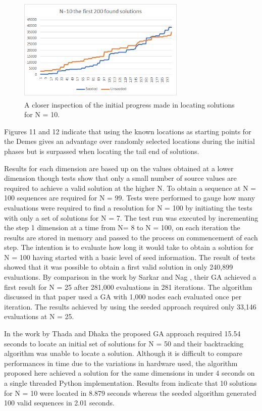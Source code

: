 \documentclass[conference]{IEEEtran}
\begin{document}
\begin{figure}[!htbp]
	\centering	
	\includegraphics[width=8cm, height=5cm]{First200Progress}
	\caption{A closer inspection of the initial progress made in locating solutions for N = 10.}
\end{figure}

Figures 11 and 12 indicate that using the known locations as starting points for the Demes gives an advantage over randomly selected locations during the initial phases but is surpassed when locating the tail end of solutions. 

Results for each dimension are based up on the values obtained at a lower dimension though tests show that only a small number of source values are required to achieve a valid solution at the higher N. To obtain a sequence at N = 100 sequences are required for N = 99. Tests were performed to gauge how many evaluations were required to find a resolution for N = 100 by initiating the tests with only a set of solutions for N = 7. The test run was executed by incrementing the step 1 dimension at a time from N= 8 to N = 100, on each iteration the results are stored in memory and passed to the process on commencement of each step. The intention is to evaluate how long it would take to obtain a solution for N = 100 having started with a basic level of seed information. The result of tests showed that it was possible to obtain a first valid solution in only 240,899 evaluations. By comparison in the work by Sarkar and Nag \cite{Adaptive}, their GA achieved a first result for N = 25 after 281,000 evaluations in 281 iterations. The algorithm discussed in that paper used a GA with 1,000 nodes each evaluated once per iteration. The results achieved by using the seeded approach required only 33,146 evaluations at N = 25.

In the work by Thada and Dhaka \cite{Performance} the proposed GA approach required 15.54 seconds to locate an initial set of solutions for N = 50 and their backtracking algorithm was unable to locate a solution. Although it is difficult to compare performances in time due to the variations in hardware used, the algorithm proposed here achieved a solution for the same dimensions in under 4 seconds on a single threaded Python implementation. Results from \cite{Performance} indicate that 10 solutions for N = 10 were located in 8.879 seconds whereas the seeded algorithm generated 100 valid sequences in 2.01 seconds.
\end{document}
